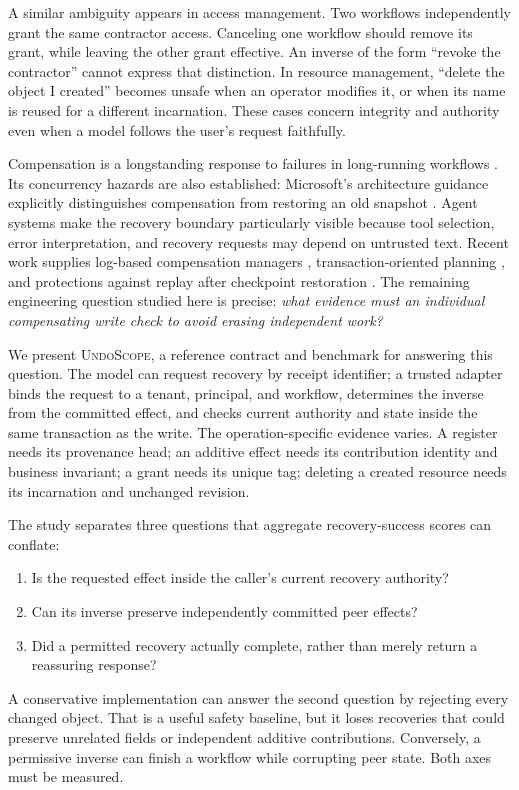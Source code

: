 \documentclass[10pt,twocolumn]{article}
\newcommand{\US}{\textsc{UndoScope}}
\begin{document}
A similar ambiguity appears in access management. Two workflows independently grant the same contractor access. Canceling one workflow should remove its grant, while leaving the other grant effective. An inverse of the form ``revoke the contractor'' cannot express that distinction. In resource management, ``delete the object I created'' becomes unsafe when an operator modifies it, or when its name is reused for a different incarnation. These cases concern integrity and authority even when a model follows the user's request faithfully.

Compensation is a longstanding response to failures in long-running workflows \cite{sagas}. Its concurrency hazards are also established: Microsoft's architecture guidance explicitly distinguishes compensation from restoring an old snapshot \cite{azure}. Agent systems make the recovery boundary particularly visible because tool selection, error interpretation, and recovery requests may depend on untrusted text. Recent work supplies log-based compensation managers \cite{rac}, transaction-oriented planning \cite{sagallm}, and protections against replay after checkpoint restoration \cite{acrfence}. The remaining engineering question studied here is precise: \emph{what evidence must an individual compensating write check to avoid erasing independent work?}

We present \US{}, a reference contract and benchmark for answering this question. The model can request recovery by receipt identifier; a trusted adapter binds the request to a tenant, principal, and workflow, determines the inverse from the committed effect, and checks current authority and state inside the same transaction as the write. The operation-specific evidence varies. A register needs its provenance head; an additive effect needs its contribution identity and business invariant; a grant needs its unique tag; deleting a created resource needs its incarnation and unchanged revision.

The study separates three questions that aggregate recovery-success scores can conflate:
\begin{enumerate}
\item Is the requested effect inside the caller's current recovery authority?
\item Can its inverse preserve independently committed peer effects?
\item Did a permitted recovery actually complete, rather than merely return a reassuring response?
\end{enumerate}
A conservative implementation can answer the second question by rejecting every changed object. That is a useful safety baseline, but it loses recoveries that could preserve unrelated fields or independent additive contributions. Conversely, a permissive inverse can finish a workflow while corrupting peer state. Both axes must be measured.
\end{document}

